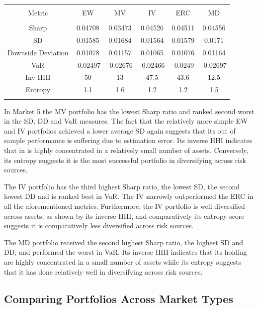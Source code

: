 \documentclass[11pt,preprint, authoryear]{elsarticle}
\let\origtable\table
\let\endorigtable\endtable
\renewenvironment{table}[1][2] {
    \expandafter\origtable\expandafter[H]
} {
    \endorigtable
}
\numberwithin{equation}{section}
\numberwithin{figure}{section}
\numberwithin{table}{section}
\begin{document}
\begin{table}[!htbp] \centering 
  \caption{Market 5 - Portfolio Risk Metrics} 
  \label{rm5} 
\begin{tabular}{@{\extracolsep{5pt}} cccccc} 
\\[-1.8ex]\hline 
\hline \\[-1.8ex] 
Metric & EW & MV & IV & ERC & MD \\ 
\hline \\[-1.8ex] 
Sharp & 0.04708 & 0.03473 & 0.04526 & 0.04511 & 0.04556 \\ 
SD & 0.01585 & 0.01684 & 0.01564 & 0.01579 & 0.0171 \\ 
Downside Deviation & 0.01078 & 0.01157 & 0.01065 & 0.01076 & 0.01164 \\ 
VaR & -0.02497 & -0.02676 & -0.02466 & -0.0249 & -0.02697 \\ 
Inv HHI & 50 & 13 & 47.5 & 43.6 & 12.5 \\ 
Entropy & 1.1 & 1.6 & 1.2 & 1.2 & 1.5 \\ 
\hline \\[-1.8ex] 
\end{tabular} 
\end{table}

In Market 5 the MV portfolio has the lowest Sharp ratio and ranked
second worst in the SD, DD and VaR measures. The fact that the
relatively more simple EW and IV portfolios achieved a lower average SD
again suggests that its out of sample performance is suffering due to
estimation error. Its inverse HHI indicates that in is highly
concentrated in a relatively small number of assets. Conversely, its
entropy suggests it is the most successful portfolio in diversifying
across risk sources.

The IV portfolio has the third highest Sharp ratio, the lowest SD, the
second lowest DD and is ranked best in VaR. The IV narrowly outperformed
the ERC in all the aforementioned metrics. Furthermore, the IV portfolio
is well diversified across assets, as shown by its inverse HHI, and
comparatively its entropy score suggests it is comparatively less
diversified across risk sources.

The MD portfolio received the second highest Sharp ratio, the highest SD
and DD, and performed the worst in VaR. Its inverse HHI indicates that
its holding are highly concentrated in a small number of assets while
its entropy suggests that it has done relatively well in diversifying
across risk sources.

\hypertarget{comparing-portfolios-across-market-types}{%
\subsection{\texorpdfstring{Comparing Portfolios Across Market Types
\label {cross-market}}{Comparing Portfolios Across Market Types }}\label{comparing-portfolios-across-market-types}}
\end{document}
